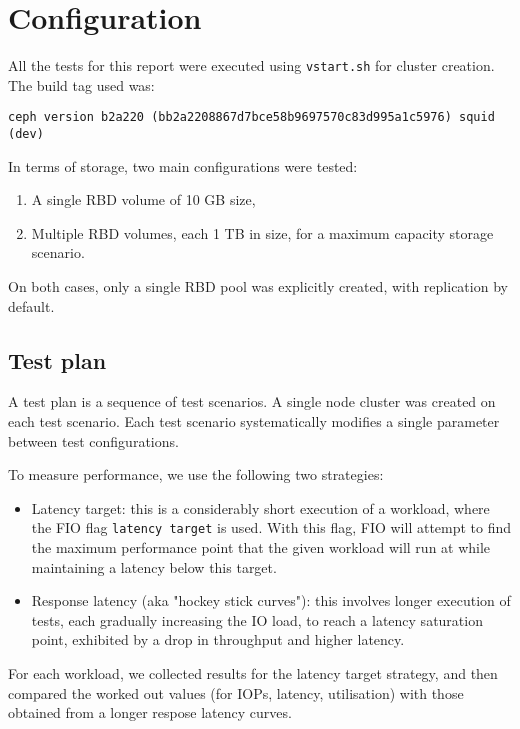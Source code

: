 \chapter{Configuration}

All the tests for this report were executed using {\tt vstart.sh} for cluster creation. The build tag used was:
\begin{small}
\begin{verbatim}
ceph version b2a220 (bb2a2208867d7bce58b9697570c83d995a1c5976) squid (dev)
\end{verbatim}
\end{small}

In terms of storage, two main configurations were tested:
\begin{enumerate}
  \item A single RBD volume of 10 GB size,
  \item Multiple RBD volumes, each 1 TB in size, for a maximum capacity storage scenario.
\end{enumerate}
On both cases, only a single RBD pool was explicitly created, with replication by default.

\section{Test plan}

A test plan is a sequence of test scenarios. A single node cluster was created on each test scenario. Each
test scenario systematically modifies a single parameter between test configurations. 

To measure performance, we use the following two strategies:

\begin{itemize}
  \item Latency target: this is a considerably short execution of a workload, where the FIO flag
    {\tt latency target}  is used. With this flag, FIO will attempt to find
    the maximum performance point that the given workload will run at while maintaining a
    latency below this target.
  \item Response latency (aka "hockey stick curves"): this involves longer execution of tests, each
    gradually increasing the IO load, to reach a latency saturation point, exhibited by a drop in
    throughput and higher latency. 
\end{itemize}

For each workload, we collected results for the latency target strategy, and then compared the worked out values (for IOPs, latency, utilisation) with those obtained from a longer respose latency curves.


